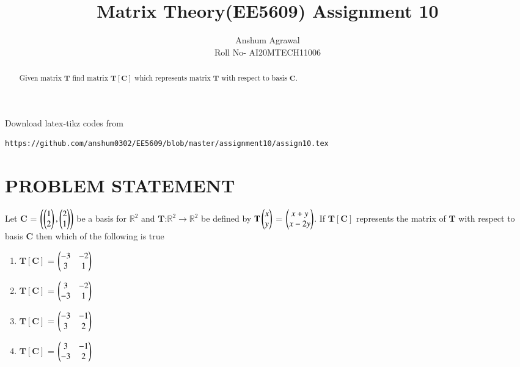 \documentclass[journal,12pt,twocolumn]{IEEEtran}
\begin{document}
\makeatother
\let\StandardTheFigure\thefigure
\let\vec\mathbf
\renewcommand{\thefigure}{\theproblem}
\def\putbox#1#2#3{\makebox[0in][l]{\makebox[#1][l]{}\raisebox{\baselineskip}[0in][0in]{\raisebox{#2}[0in][0in]{#3}}}}
     \def\rightbox#1{\makebox[0in][r]{#1}}
     \def\centbox#1{\makebox[0in]{#1}}
     \def\topbox#1{\raisebox{-\baselineskip}[0in][0in]{#1}}
     \def\midbox#1{\raisebox{-0.5\baselineskip}[0in][0in]{#1}}
\vspace{3cm}
\title{Matrix Theory(EE5609) Assignment 10}
\author{Anshum Agrawal \\ Roll No- AI20MTECH11006}
%
\maketitle
\newpage
\bigskip
\renewcommand{\thefigure}{\theenumi}
\renewcommand{\thetable}{\arabic{table}}
\begin{abstract}
Given matrix $\vec{T}$ find matrix $\vec{T[C]}$ which represents matrix $\vec{T}$ with respect to basis $\vec{C}$.
\end{abstract}
%
Download latex-tikz codes from 
%
\begin{lstlisting}
https://github.com/anshum0302/EE5609/blob/master/assignment10/assign10.tex
\end{lstlisting}
%
\section{\textbf{PROBLEM STATEMENT}}
Let $\vec{C}$ = $\begin{pmatrix}\begin{pmatrix}1\\2\end{pmatrix},\begin{pmatrix}2\\1\end{pmatrix}\end{pmatrix}$ be a basis for $\mathbb{R}^2$ and $\vec{T}$:$\mathbb{R}^2$$\rightarrow$$\mathbb{R}^2$ be defined by $\vec{T}\myvec{x\\y}$ = $\begin{pmatrix}x+y\\x-2y\end{pmatrix}$. If $\vec{T[C]}$ represents the matrix of $\vec{T}$ with respect to basis $\vec{C}$ then which of the following is true
\begin{enumerate}
    \item $\vec{T[C]}$ = $\begin{pmatrix}-3&-2\\3&1\end{pmatrix}$ 
    \item $\vec{T[C]}$ = $\begin{pmatrix}3&-2\\-3&1\end{pmatrix}$
    \item $\vec{T[C]}$ = $\begin{pmatrix}-3&-1\\3&2\end{pmatrix}$
    \item $\vec{T[C]}$ = $\begin{pmatrix}3&-1\\-3&2\end{pmatrix}$
\end{enumerate}
\end{document}
